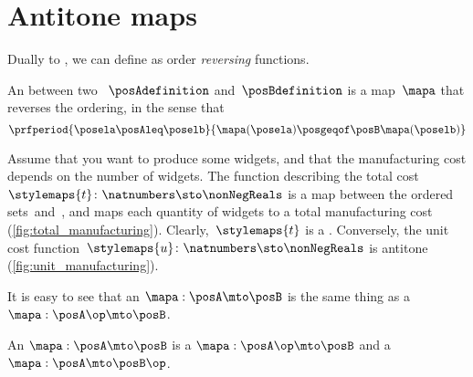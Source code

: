 \section{Antitone maps}

Dually to  , we can define  as order \emph{reversing} functions.

\begin{definition}
    \label{def:antitone}
    An  between two ~$\posAdefinition$ and~$\posBdefinition$ is a map~$\mapa$ that reverses the ordering, in the sense that
    \begin{equation}
        \prfperiod{
            \posela \posAleq \poselb
        }{
            \mapa(\posela) \posgeqof\posB \mapa(\poselb)
        }
    \end{equation}
\end{definition}

\begin{example}
    Assume that you want to produce some widgets, and that the manufacturing cost depends on the number of widgets.
    The function describing the total cost~$\stylemaps{t}\colon \natnumbers \sto \nonNegReals$ is a map between the ordered sets~\natnumbers and~\nonNegReals, and maps each quantity of widgets to a total manufacturing cost (\cref{fig:total_manufacturing}).
    Clearly,~$\stylemaps{t}$ is a .
    Conversely, the unit cost function~$\stylemaps{u}\colon \natnumbers \sto \nonNegReals$ is antitone (\cref{fig:unit_manufacturing}).
\end{example}

\begin{figure}[h!]
\end{figure}

It is easy to see that an  $\mapa: \posA \mto \posB$ is the same thing as a  $\mapa: \posA\op \mto \posB$.

\begin{lemma}\label{lem:antitone-is-monotone}
    An   $\mapa: \posA \mto \posB$ is a  $\mapa: \posA\op \mto \posB$
    and a  $\mapa: \posA \mto \posB\op$.
\end{lemma}
